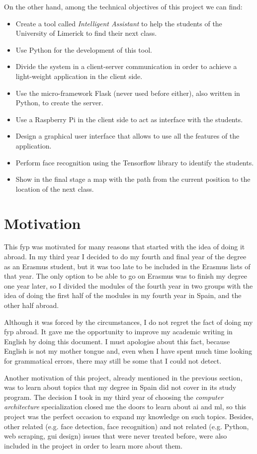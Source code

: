 On the other hand, among the technical objectives of this project we can find:
\begin{itemize}
	\item Create a tool called \textit{Intelligent Assistant} to help the students of the University of Limerick to find their next class.
	\item Use Python for the development of this tool.
	\item Divide the system in a client-server communication in order to achieve a light-weight application in the client side.
	\item Use the micro-framework Flask (never used before either), also written in Python, to create the server.
	\item Use a Raspberry Pi in the client side to act as interface with the students.
	\item Design a graphical user interface that allows to use all the features of the application.
	\item Perform face recognition using the Tensorflow library to identify the students.
	\item Show in the final stage a map with the path from the current position to the location of the next class.
\end{itemize}

\section{Motivation}
This \gls{fyp} was motivated for many reasons that started with the idea of doing it abroad. In my third year I decided to do my fourth and final year of the degree as an Erasmus student, but it was too late to be included in the Erasmus lists of that year. The only option to be able to go on Erasmus was to finish my degree one year later, so I divided the modules of the fourth year in two groups with the idea of doing the first half of the modules in my fourth year in Spain, and the other half abroad. 

Although it was forced by the circumstances, I do not regret the fact of doing my \gls{fyp} abroad. It gave me the opportunity to improve my academic writing in English by doing this document. I must apologise about this fact, because English is not my mother tongue and, even when I have spent much time looking for grammatical errors, there may still be some that I could not detect.

\clearpage

Another motivation of this project, already mentioned in the previous section, was to learn about topics that my degree in Spain did not cover in its study program. The decision I took in my third year of choosing the \textit{computer architecture} specialization closed me the doors to learn about \gls{ai} and \gls{ml}, so this project was the perfect occasion to expand my knowledge on such topics. Besides, other related (e.g. face detection, face recognition) and not related (e.g. Python, web \gls{scraping}, \gls{gui} design) issues that were never treated before, were also included in the project in order to learn more about them. 

